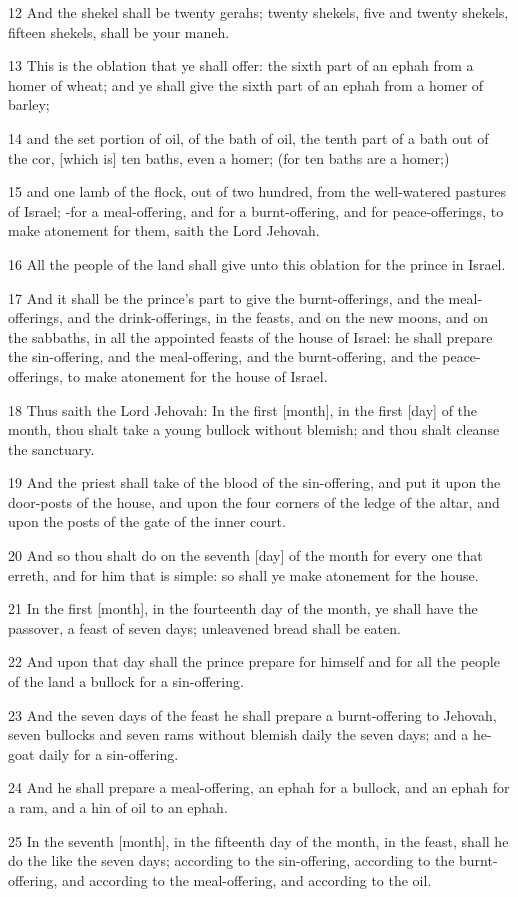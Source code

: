 \par 12 And the shekel shall be twenty gerahs; twenty shekels, five and twenty shekels, fifteen shekels, shall be your maneh.
\par 13 This is the oblation that ye shall offer: the sixth part of an ephah from a homer of wheat; and ye shall give the sixth part of an ephah from a homer of barley;
\par 14 and the set portion of oil, of the bath of oil, the tenth part of a bath out of the cor, [which is] ten baths, even a homer; (for ten baths are a homer;)
\par 15 and one lamb of the flock, out of two hundred, from the well-watered pastures of Israel; -for a meal-offering, and for a burnt-offering, and for peace-offerings, to make atonement for them, saith the Lord Jehovah.
\par 16 All the people of the land shall give unto this oblation for the prince in Israel.
\par 17 And it shall be the prince's part to give the burnt-offerings, and the meal-offerings, and the drink-offerings, in the feasts, and on the new moons, and on the sabbaths, in all the appointed feasts of the house of Israel: he shall prepare the sin-offering, and the meal-offering, and the burnt-offering, and the peace-offerings, to make atonement for the house of Israel.
\par 18 Thus saith the Lord Jehovah: In the first [month], in the first [day] of the month, thou shalt take a young bullock without blemish; and thou shalt cleanse the sanctuary.
\par 19 And the priest shall take of the blood of the sin-offering, and put it upon the door-posts of the house, and upon the four corners of the ledge of the altar, and upon the posts of the gate of the inner court.
\par 20 And so thou shalt do on the seventh [day] of the month for every one that erreth, and for him that is simple: so shall ye make atonement for the house.
\par 21 In the first [month], in the fourteenth day of the month, ye shall have the passover, a feast of seven days; unleavened bread shall be eaten.
\par 22 And upon that day shall the prince prepare for himself and for all the people of the land a bullock for a sin-offering.
\par 23 And the seven days of the feast he shall prepare a burnt-offering to Jehovah, seven bullocks and seven rams without blemish daily the seven days; and a he-goat daily for a sin-offering.
\par 24 And he shall prepare a meal-offering, an ephah for a bullock, and an ephah for a ram, and a hin of oil to an ephah.
\par 25 In the seventh [month], in the fifteenth day of the month, in the feast, shall he do the like the seven days; according to the sin-offering, according to the burnt-offering, and according to the meal-offering, and according to the oil.


